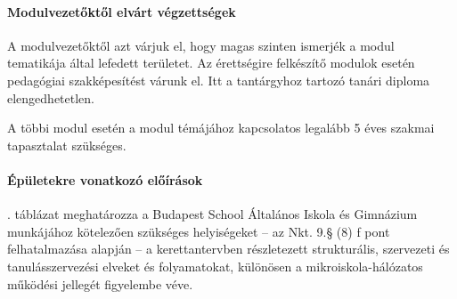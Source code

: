 \paragraph{Modulvezetőktől elvárt végzettségek}
A modulvezetőktől azt várjuk el, hogy magas szinten ismerjék a modul tematikája által lefedett területet. Az érettségire felkészítő modulok esetén pedagógiai szakképesítést várunk el. Itt a tantárgyhoz tartozó tanári diploma elengedhetetlen.

A többi modul esetén a modul témájához kapcsolatos legalább 5 éves szakmai tapasztalat szükséges.

\paragraph{Épületekre vonatkozó előírások}
. táblázat meghatározza a Budapest School Általános Iskola
és Gimnázium munkájához kötelezően szükséges helyiségeket -- az Nkt. 9.§ (8) f pont felhatalmazása alapján -- a kerettantervben részletezett strukturális, szervezeti és tanulásszervezési elveket és folyamatokat, különösen a mikroiskola-hálózatos működési jellegét figyelembe véve.

